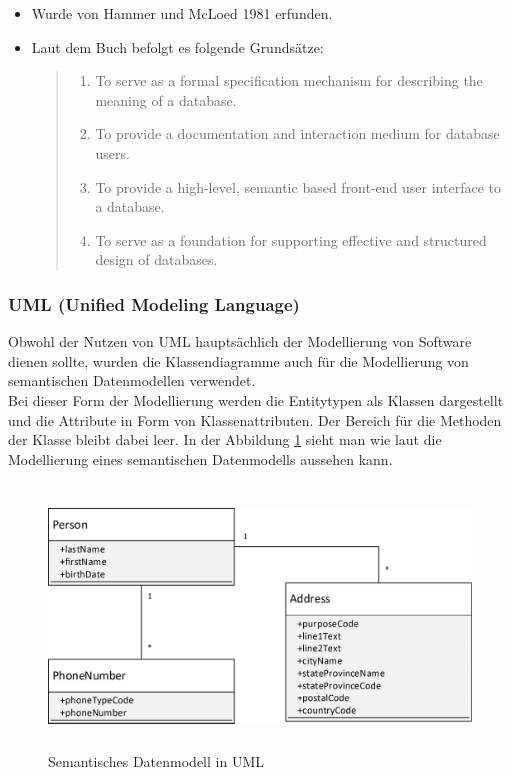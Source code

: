 \begin{itemize}
	\item Wurde von Hammer und McLoed 1981 erfunden.
	\item Laut dem Buch \cite{semantischOnlineBuch} befolgt es folgende Grundsätze:
	\begin{quote}
		\begin{enumerate}
			\item To serve as a formal specification mechanism for describing the meaning of a database.
			\item To provide a documentation and interaction medium for database users.
			\item To provide a high-level, semantic based front-end user interface to a database.
			\item To serve as a foundation for supporting effective and structured design of databases.
			\\
		\end{enumerate}
	\end{quote}
\end{itemize}

\subsubsection{UML (Unified Modeling Language)}
\prc
Obwohl der Nutzen von UML hauptsächlich der Modellierung von Software dienen sollte, wurden die Klassendiagramme auch für die Modellierung von semantischen Datenmodellen verwendet.
\\

\noindent
Bei dieser Form der Modellierung werden die Entitytypen als Klassen dargestellt und die Attribute in Form von Klassenattributen. Der Bereich für die Methoden der Klasse bleibt dabei leer. In der Abbildung \ref{uml} sieht man wie laut \cite{sqlDataModeling} die Modellierung eines semantischen Datenmodells aussehen kann.

\begin{figure}[!h]
	\begin{center}
		\includegraphics[width=13cm, height=7cm]{images/uml.jpg}
		\caption{Semantisches Datenmodell in UML}
		\label{uml}
	\end{center}
\end{figure}

